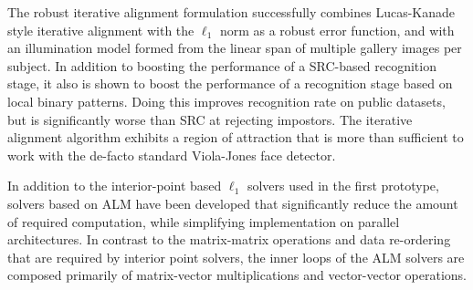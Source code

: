 The robust iterative alignment formulation successfully combines Lucas-Kanade
style iterative alignment with the $\ell_1$ norm as a robust error function,
and with an illumination model formed from the linear span of multiple gallery
images per subject.  In addition to boosting the performance of a SRC-based
recognition stage, it also is shown to boost the performance of a recognition
stage based on local binary patterns.  Doing this improves recognition rate on
public datasets, but is significantly worse than SRC at rejecting impostors.
The iterative alignment algorithm exhibits a region of attraction that is more
than sufficient to work with the de-facto standard Viola-Jones face detector.

In addition to the interior-point based $\ell_1$ solvers used in the first
prototype, solvers based on ALM have been developed that significantly reduce
the amount of required computation, while simplifying implementation on
parallel architectures.  In contrast to the matrix-matrix operations and data
re-ordering that are required by interior point solvers, the inner loops of the
ALM solvers are composed primarily of matrix-vector multiplications and
vector-vector operations.

